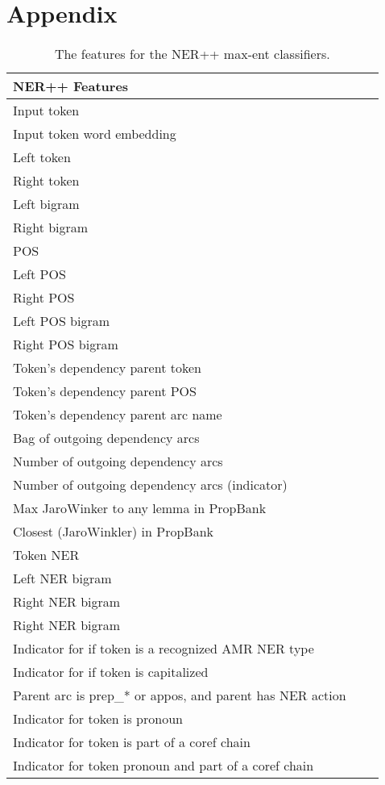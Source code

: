 \documentclass[11pt]{article}
\begin{document}
\section{Appendix}

\begin{table}[h]
\begin{center}
\begin{tabular}{|l|rl|}
\hline \bf NER++ Features \\ \hline
Input token\\
Input token word embedding\\
Left token\\
Right token\\
Left bigram\\
Right bigram\\
POS\\
Left POS\\
Right POS\\
Left POS bigram\\
Right POS bigram\\
Token's dependency parent token\\
Token's dependency parent POS\\
Token's dependency parent arc name\\
Bag of outgoing dependency arcs\\
Number of outgoing dependency arcs\\
Number of outgoing dependency arcs (indicator)\\
Max JaroWinker to any lemma in PropBank\\
Closest (JaroWinkler) in PropBank\\
Token NER\\
Left NER bigram\\
Right NER bigram\\
Right NER bigram\\
Indicator for if token is a recognized AMR NER type\\
Indicator for if token is capitalized\\
Parent arc is prep\_* or appos, and parent has NER action\\
Indicator for token is pronoun\\
Indicator for token is part of a coref chain\\
Indicator for token pronoun and part of a coref chain\\
\hline
\end{tabular}
\end{center}
\caption{\label{font-table} The features for the NER++ max-ent classifiers. }
\end{table}
\end{document}
